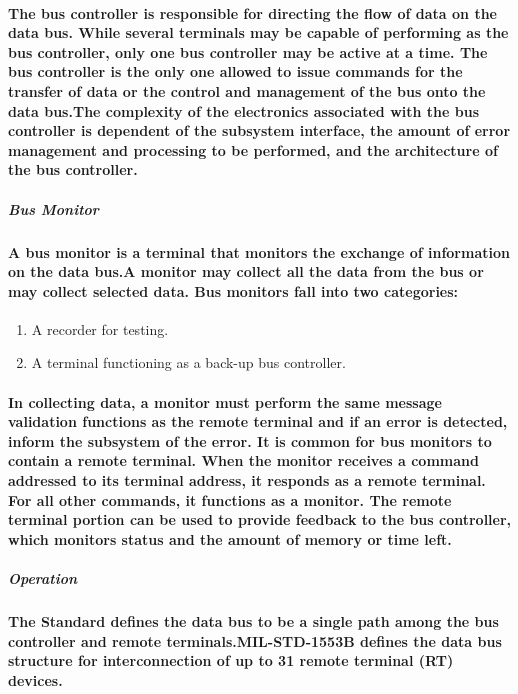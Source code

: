 \documentclass[12pt,a4paper]{report}
\begin{document}
\paragraph{\textrm{\textmd{The bus controller is responsible for directing the flow of data on the data
			bus. While several terminals may be capable of performing as the bus
			controller, only one bus controller may be active at a time. The bus
			controller is the only one allowed to issue commands for the transfer of data or the control and management of the bus onto the data bus.The complexity of the electronics associated with the
			bus controller is dependent of the subsystem interface, the amount of error management and processing to be
			performed, and the architecture of the bus controller.}}}
\subparagraph{Bus Monitor}
\paragraph{\textrm{\textmd{A bus monitor is a terminal that monitors the exchange of
information on the data bus.A monitor may collect all the data from the bus or may collect selected data.
Bus
monitors fall into two categories:}}}
\begin{enumerate}
	\item A recorder for testing.
	\item A terminal functioning as a back-up bus controller.
\end{enumerate} 
\paragraph{\textrm{\textmd{In collecting data, a monitor must perform the same message validation
functions as the remote terminal and if an error is detected, inform the
subsystem of the error.
It is common for bus monitors to contain a remote terminal. When
the monitor receives a command addressed to its terminal address, it
responds as a remote terminal. For all other commands, it functions as a
monitor. The remote terminal portion can be used to provide feedback to
the bus controller, which monitors status and the amount of memory or
time left.}}}
\subparagraph{Operation}
\paragraph{\textrm{\textmd{The Standard defines the data bus to be a single path among the bus controller and remote terminals.MIL-STD-1553B defines the data bus structure for interconnection of up to 31 remote terminal (RT) devices.}}}
\end{document}
